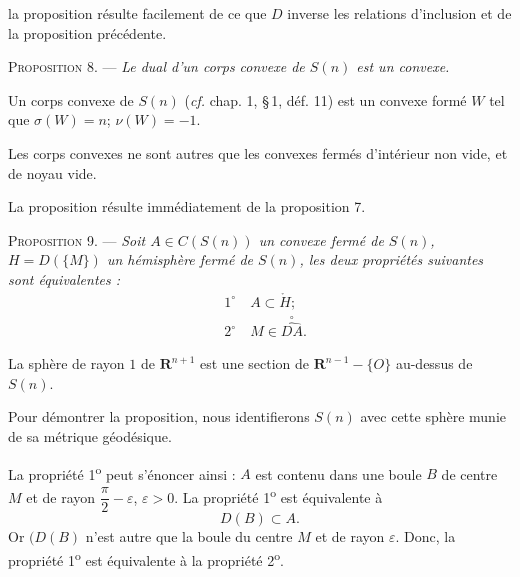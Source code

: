 \documentclass[11pt]{article}
\newcommand{\R}{\boldsymbol{R}}
\newcommand{\bzcf}[2]{#1}
\newcommand{\intr}[1]{\overset{\circ}{\widehat{#1}}}
\newenvironment{prop}[1][]{\par\medskip\noindent\textsc{Proposition #1.} --- \itshape}{\par\medskip}
\newenvironment{proof}[1][]{\par}{\par}
\begin{document}
\begin{proof}
la proposition résulte facilement de ce que $D$ inverse les relations d'inclusion et de \bzcf{la
proposition précédente}{\ref{bzprop:c3s3p6_dual_sous_variete}}.
\end{proof}

\begin{prop}[8]
Le dual d'un corps convexe de $S(n)$ est un convexe.
\end{prop}

\begin{proof}
Un corps convexe de $S(n)$ (\bzcf{\textit{cf.} chap. 1, \S\,1,
déf. 11}{\ref{bzdef:c1s1d11_corps_convexe}}) est un convexe formé $W$ tel que $\sigma(W)=n$;
$\nu(W)=-1$.

Les corps convexes ne sont autres que les convexes fermés d'intérieur non vide, et de noyau vide.

La proposition résulte immédiatement de \bzcf{la proposition
7}{\ref{bzprop:c3s3p7_noyau_support}}.
\end{proof}

\begin{prop}[9]
Soit $A\in C(S(n))$ un convexe fermé de $S(n)$, $H=D(\{M\})$ un hémisphère fermé de $S(n)$, les
deux propriétés suivantes sont équivalentes :
\[ \begin{aligned} &1^{\circ}\quad A\subset\mathring{H};\\ &2^{\circ}\quad M\in\intr{DA}.
\end{aligned} \]
\end{prop}

\begin{proof}
La sphère de rayon $1$ de $\R^{n+1}$ est une section de $\R^{n-1}-\{O\}$ au-dessus de $S(n)$.

Pour démontrer la proposition, nous identifierons $S(n)$ avec cette sphère munie de sa métrique
géodésique.

La propriété 1\textsuperscript{o} peut s'énoncer ainsi : $A$ est contenu dans une boule $B$ de
centre $M$ et de rayon $\dfrac{\pi}{2}-\varepsilon$, $\varepsilon>0$. La propriété
1\textsuperscript{o} est équivalente à
\[ D(B)\subset A. \]
Or $(D(B)$ n'est autre que la boule du centre $M$ et de rayon $\varepsilon$. Donc, la propriété
1\textsuperscript{o} est équivalente à la propriété 2\textsuperscript{o}.
\end{proof}
\end{document}
